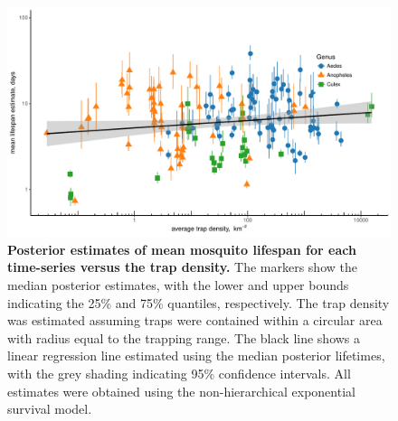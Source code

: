 \documentclass[12pt]{article}
\begin{document}
\begin{figure}[h]
	\centerline{\includegraphics[width=1\textwidth]{./Figure_files/mrr_lifespanVsTrapDensity.pdf}}
	\caption{\textbf{Posterior estimates of mean mosquito lifespan for each time-series versus the trap density.} The markers show the median posterior estimates, with the lower and upper bounds indicating the 25\% and 75\% quantiles, respectively. The trap density was estimated assuming traps were contained within a circular area with radius equal to the trapping range. The black line shows a linear regression line estimated using the median posterior lifetimes, with the grey shading indicating 95\% confidence intervals. All estimates were obtained using the non-hierarchical exponential survival model.}
	\label{fig:mrr_lifeSpanVsTrapDensity}
\end{figure}
\end{document}
